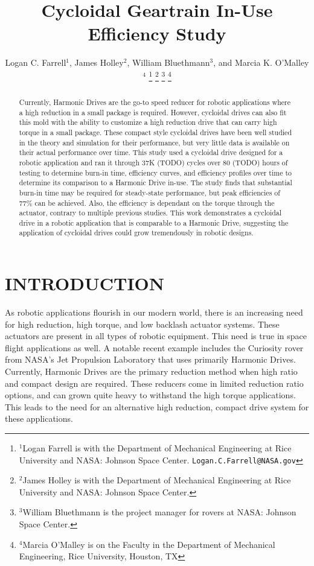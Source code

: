 \documentclass[letterpaper, 10 pt, conference]{ieeeconf}  %
\title{\LARGE \bf
Cycloidal Geartrain In-Use Efficiency Study
}
\author{Logan C. Farrell$^{1}$, James Holley$^{2}$, William Bluethmann$^{3}$, and Marcia K. O'Malley$^{4}$%
\thanks{$^{1}$Logan Farrell is with the Department of Mechanical Engineering at Rice University and NASA: Johnson Space Center.
		{\tt\small Logan.C.Farrell@NASA.gov}}%
\thanks{$^{2}$James Holley is with the Department of Mechanical Engineering at Rice University and NASA: Johnson Space Center.}%
\thanks{$^{3}$William Bluethmann is the project manager for rovers at NASA: Johnson Space Center.}%
\thanks{$^{4}$Marcia O'Malley is on the Faculty in the Department of Mechanical Engineering, Rice University, Houston, TX}%
}
\begin{document}
\maketitle
\thispagestyle{empty}
\pagestyle{empty}


\begin{abstract}

Currently, Harmonic Drives are the go-to speed reducer for robotic applications where a high reduction in a small package is required. However, cycloidal drives can also fit this mold with the ability to customize a high reduction drive that can carry high torque in a small package. These compact style cycloidal drives have been well studied in the theory and simulation for their performance, but very little data is available on their actual performance over time. This study used a cycloidal drive designed for a robotic application and ran it through 37K (TODO) cycles over 80 (TODO) hours of testing to determine burn-in time, efficiency curves, and efficiency profiles over time to determine its comparison to a Harmonic Drive in-use. The study finds that substantial burn-in time may be required for steady-state performance, but peak efficiencies of 77\% can be achieved. Also, the efficiency is dependant on the torque through the actuator, contrary to multiple previous studies. This work demonstrates a cycloidal drive in a robotic application that is comparable to a Harmonic Drive, suggesting the application of cycloidal drives could grow tremendously in robotic designs. 

\end{abstract}


\section{INTRODUCTION}
As robotic applications flourish in our modern world, there is an increasing need for  high reduction, high torque, and low backlash actuator systems. These actuators are present in all types of robotic equipment. This need is true in space flight applications as well. A notable recent example includes the Curiosity rover from NASA's Jet Propulsion Laboratory \cite{curiosity} that uses primarily Harmonic Drives. Currently, Harmonic Drives are the primary reduction method when high ratio and compact design are required. These reducers come in limited reduction ratio options, and can grown quite heavy to withstand the high torque applications. This leads to the need for an alternative high reduction, compact drive system for these applications. 
\end{document}
